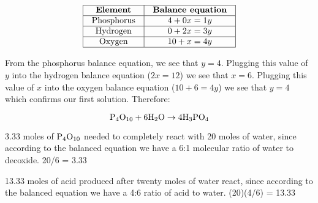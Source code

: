 
$$\vbox{\offinterlineskip
\halign{\strut
\vrule \quad\hfil # \ \hfil & 
\vrule \quad\hfil # \ \hfil \vrule \cr
\noalign{\hrule}
%
{\bf Element} & {\bf Balance equation} \cr
%
\noalign{\hrule}
%
Phosphorus & $4 + 0x = 1y$ \cr
%
\noalign{\hrule}
%
Hydrogen & $0 + 2x = 3y$ \cr
%
\noalign{\hrule}
%
Oxygen & $10 + x = 4y$ \cr
%
\noalign{\hrule}
} %
}$$ %

From the phosphorus balance equation, we see that $y = 4$.  Plugging this value of $y$ into the hydrogen balance equation ($2x = 12$) we see that $x = 6$.  Plugging this value of $x$ into the oxygen balance equation ($10 + 6 = 4y$) we see that $y = 4$ which confirms our first solution.  Therefore:

$$\hbox{P}_4\hbox{O}_{10} + \hbox{6H}_2\hbox{O} \to \hbox{4H}_3\hbox{PO}_4$$

\vskip 10pt

3.33 moles of $\hbox{P}_4\hbox{O}_{10}$ needed to completely react with 20 moles of water, since according to the balanced equation we have a 6:1 molecular ratio of water to decoxide.  20/6 = 3.33

\vskip 10pt

13.33 moles of acid produced after twenty moles of water react, since according to the balanced equation we have a 4:6 ratio of acid to water.  (20)(4/6) = 13.33






